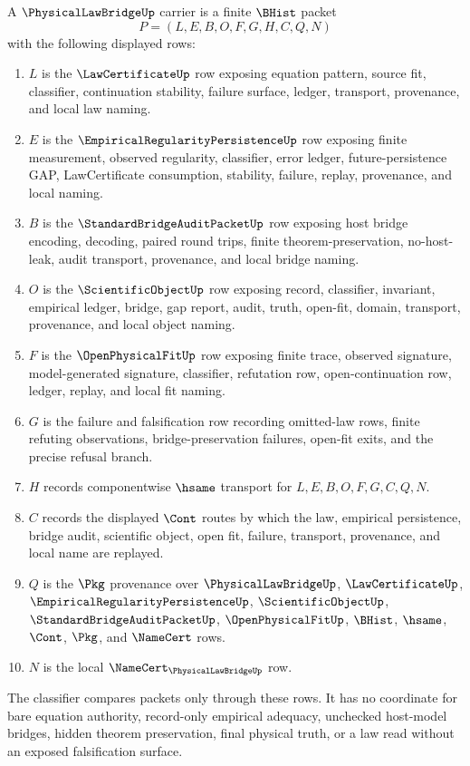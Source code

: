 \begin{definition}
\label{def:physical-law-bridge-carrier}
A $\PhysicalLawBridgeUp$ carrier is a finite $\BHist$ packet
$$
P=(L,E,B,O,F,G,H,C,Q,N)
$$
with the following displayed rows:
\begin{enumerate}
\item $L$ is the $\LawCertificateUp$ row exposing equation pattern, source fit, classifier, continuation stability, failure surface, ledger, transport, provenance, and local law naming.
\item $E$ is the $\EmpiricalRegularityPersistenceUp$ row exposing finite measurement, observed regularity, classifier, error ledger, future-persistence GAP, LawCertificate consumption, stability, failure, replay, provenance, and local naming.
\item $B$ is the $\StandardBridgeAuditPacketUp$ row exposing host bridge encoding, decoding, paired round trips, finite theorem-preservation, no-host-leak, audit transport, provenance, and local bridge naming.
\item $O$ is the $\ScientificObjectUp$ row exposing record, classifier, invariant, empirical ledger, bridge, gap report, audit, truth, open-fit, domain, transport, provenance, and local object naming.
\item $F$ is the $\OpenPhysicalFitUp$ row exposing finite trace, observed signature, model-generated signature, classifier, refutation row, open-continuation row, ledger, replay, and local fit naming.
\item $G$ is the failure and falsification row recording omitted-law rows, finite refuting observations, bridge-preservation failures, open-fit exits, and the precise refusal branch.
\item $H$ records componentwise $\hsame$ transport for $L,E,B,O,F,G,C,Q,N$.
\item $C$ records the displayed $\Cont$ routes by which the law, empirical persistence, bridge audit, scientific object, open fit, failure, transport, provenance, and local name are replayed.
\item $Q$ is the $\Pkg$ provenance over $\PhysicalLawBridgeUp$, $\LawCertificateUp$, $\EmpiricalRegularityPersistenceUp$, $\ScientificObjectUp$, $\StandardBridgeAuditPacketUp$, $\OpenPhysicalFitUp$, $\BHist$, $\hsame$, $\Cont$, $\Pkg$, and $\NameCert$ rows.
\item $N$ is the local $\NameCert_{\PhysicalLawBridgeUp}$ row.
\end{enumerate}
The classifier compares packets only through these rows. It has no coordinate for bare equation authority, record-only empirical adequacy, unchecked host-model bridges, hidden theorem preservation, final physical truth, or a law read without an exposed falsification surface.
\end{definition}

